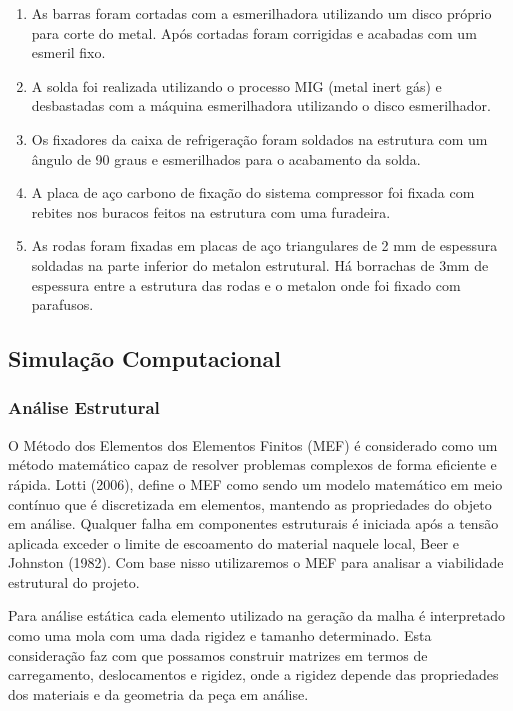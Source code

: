 \begin{enumerate}
\item As barras foram cortadas com a esmerilhadora utilizando um disco próprio para corte do metal. Após cortadas foram corrigidas e acabadas com um esmeril fixo.
\item A solda foi realizada utilizando o processo MIG (metal inert gás) e desbastadas com a máquina esmerilhadora utilizando o disco esmerilhador.
\item Os fixadores da caixa de refrigeração foram soldados na estrutura com um ângulo de 90 graus e esmerilhados para o acabamento da solda.
\item A placa de aço carbono de fixação do sistema compressor foi fixada com rebites nos buracos feitos na estrutura com uma furadeira.
\item As rodas foram fixadas em placas de aço triangulares de 2 mm de espessura soldadas na parte inferior do metalon estrutural. Há borrachas de 3mm de espessura entre a estrutura das rodas e o metalon onde foi fixado com parafusos.
\end{enumerate}


\subsection{Simulação Computacional}

\subsubsection{Análise Estrutural}

O Método dos Elementos dos Elementos Finitos (MEF) é considerado como um método matemático capaz de resolver problemas complexos de forma eficiente e rápida. Lotti (2006), define o MEF como sendo um modelo matemático em meio contínuo que é discretizada em elementos, mantendo as propriedades do objeto em análise. Qualquer falha em componentes estruturais é iniciada após a tensão aplicada exceder o limite de escoamento do material naquele local, Beer e Johnston (1982). Com base nisso utilizaremos o MEF para analisar a viabilidade estrutural do projeto.

Para análise estática cada elemento utilizado na geração da malha é interpretado como uma mola com uma dada rigidez e tamanho determinado. Esta consideração faz com que possamos construir matrizes em termos de carregamento, deslocamentos e rigidez, onde a rigidez depende das propriedades dos materiais e da geometria da peça em análise.

